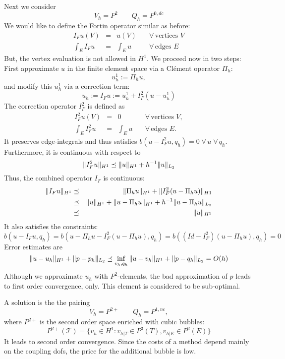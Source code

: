 Next we consider
$$
V_h = P^2 \qquad Q_h = P^{0,dc}
$$
We would like to define the Fortin operator similar as before:
$$
\begin{array}{rcll}
I_F u(V) & = & u(V)  \quad & \forall \, \text{vertices } V \\[0.5em]
\int_E I_F u & = & \int_E u \quad & \forall \, \text{edges } E
\end{array}
$$
But, the vertex evaluation is not allowed in $H^1$. We proceed now in two steps: First approximate $u$ in the finite element space via a Cl\'ement operator $\Pi_h$:
$$
u_h^1 := \Pi_h u,
$$
and modify this $u_h^1$ via a correction term:
$$
u_h := I_F u := u_h^1 + I_F^2 (u - u_h^1)
$$
The correction operator $I_F^2$ is defined as
$$
\begin{array}{rcll}
I_F^2 u(V) & = & 0  \quad & \forall \, \text{vertices } V, \\[0.5em]
\int_E I_F^2 u & = & \int_E u \quad & \forall \, \text{edges } E.
\end{array}
$$
It preserves edge-integrals and thus satisfies $b(u - I_F^2 u, q_h) =
0 \; \forall \, u \; \forall \, q_h$. Furthermore, it is continuous with respect to
$$
\| I_F^2 u \|_{H^1} \preceq \| u \|_{H^1} + h^{-1} \| u \|_{L_2}
$$
Thus, the combined operator $I_F$ is continuous:
\begin{eqnarray*}
\| I_F u \|_{H^1} & \preceq & \| \Pi_h u \|_{H^1} + \| I_F^2 (u-\Pi_h u) \|_{H1} \\
    & \preceq & \| u \|_{H^1} + \| u - \Pi_h u\|_{H^1} + h^{-1 } \| u - \Pi_h u \|_{L_2} \\
   & \preceq & \|  u \|_{H^1}
\end{eqnarray*}
It also satisfies the constraints:
$$
b(u - I_F u, q_h) = b(u - \Pi_h u - I_F^2 (u - \Pi_h u), q_h) = b( (Id - I_F^2)(u - \Pi_h u), q_h) = 0 
$$
Error estimates are
$$
\| u - u_h \|_{H^1} + \| p  - p_h \|_{L_2} \preceq \inf_{v_h, q_h} \| u - v_h \|_{H^1} + \| p - q_h \|_{L_2} 
= O(h)
$$
Although we approximate $u_h$ with $P^2$-elements, the bad
approximation of $p$ leads to first order convergence, only. This
element is considered to be sub-optimal.

A solution is the the pairing
$$
V_h = P^{2+} \qquad Q_h = P^{1, nc},
$$
where $P^{2+}$ is the second order space enriched with cubic bubbles:
$$
P^{2+}({\mathcal T}) = \{ v_h \in H^1 : v_{h|T} \in P^3(T), v_{h|E} \in P^2(E) \}
$$
It leads to second order convergence. Since the costs of a method depend mainly on the coupling dofs, the price for the additional bubble is low.

